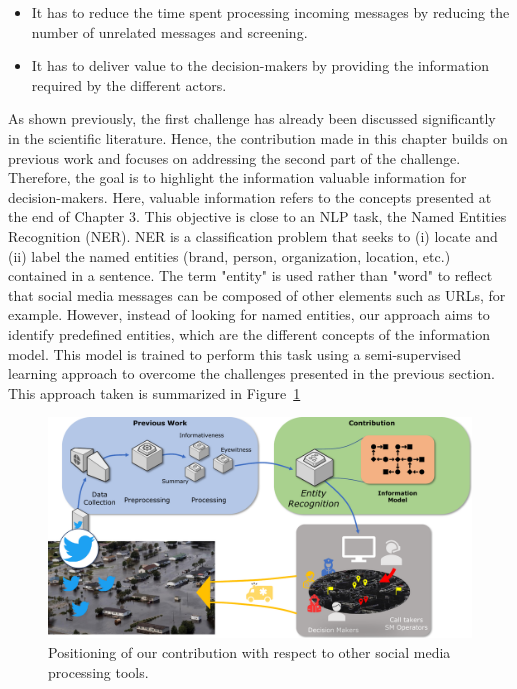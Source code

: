 \begin{itemize}
    \item It has to reduce the time spent processing incoming messages by reducing the number of unrelated messages and screening.
    \item It has to deliver value to the decision-makers by providing the information required by the different actors.
\end{itemize}

As shown previously, the first challenge has already been discussed significantly in the scientific literature.
Hence, the contribution made in this chapter builds on previous work and focuses on addressing the second part of the challenge.
Therefore, the goal is to highlight the information valuable information for decision-makers.
Here, valuable information refers to the concepts presented at the end of Chapter 3.
This objective is close to an NLP task, the Named Entities Recognition (NER).
NER is a classification problem that seeks to (i) locate and (ii) label the named entities (brand, person, organization, location, etc.) contained in a sentence.
The term "entity" is used rather than "word" to reflect that social media messages can be composed of other elements such as URLs, for example.
However, instead of looking for named entities, our approach aims to identify predefined entities, which are the different concepts of the information model.
This model is trained to perform this task using a semi-supervised learning approach to overcome the challenges presented in the previous section.
This approach taken is summarized in Figure~\ref{processing:social-media-processing-proposition}

\begin{figure}[htb]
    \centering
    \includegraphics[width=\textwidth]{figures/chap-4/social-media-processing-proposition.pdf}
    \caption{Positioning of our contribution with respect to other social media processing tools.}
    \label{processing:social-media-processing-proposition}
\end{figure}

